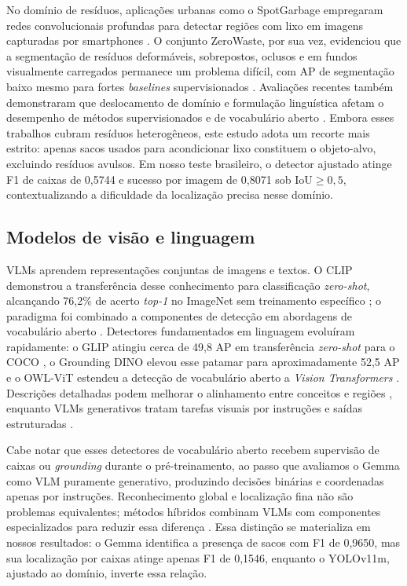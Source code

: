 \documentclass[kdmile,a4paper]{kdmile}
\begin{document}
No domínio de resíduos, aplicações urbanas como o SpotGarbage empregaram redes convolucionais profundas para detectar regiões com lixo em imagens capturadas por smartphones \cite{Mittal2016SpotGarbage}. O conjunto ZeroWaste, por sua vez, evidenciou que a segmentação de resíduos deformáveis, sobrepostos, oclusos e em fundos visualmente carregados permanece um problema difícil, com AP de segmentação baixo mesmo para fortes \emph{baselines} supervisionados \cite{Bashkirova2022ZeroWaste}. Avaliações recentes também demonstraram que deslocamento de domínio e formulação linguística afetam o desempenho de métodos supervisionados e de vocabulário aberto \cite{Abid2025WasteDetection}. Embora esses trabalhos cubram resíduos heterogêneos, este estudo adota um recorte mais estrito: apenas sacos usados para acondicionar lixo constituem o objeto-alvo, excluindo resíduos avulsos. Em nosso teste brasileiro, o detector ajustado atinge F1 de caixas de 0,5744 e sucesso por imagem de 0,8071 sob $\mathrm{IoU} \ge 0{,}5$, contextualizando a dificuldade da localização precisa nesse domínio.

\subsection{Modelos de visão e linguagem}
\label{sec:modelos-visao-linguagem}

VLMs aprendem representações conjuntas de imagens e textos. O CLIP demonstrou a transferência desse conhecimento para classificação \emph{zero-shot}, alcançando 76,2\% de acerto \emph{top-1} no ImageNet sem treinamento específico \cite{Radford2021CLIP}; o paradigma foi combinado a componentes de detecção em abordagens de vocabulário aberto \cite{Kuo2023FVLM}. Detectores fundamentados em linguagem evoluíram rapidamente: o GLIP atingiu cerca de 49,8 AP em transferência \emph{zero-shot} para o COCO \cite{Li2022GLIP}, o Grounding DINO elevou esse patamar para aproximadamente 52,5 AP \cite{Liu2024GroundingDINO} e o OWL-ViT estendeu a detecção de vocabulário aberto a \emph{Vision Transformers} \cite{Minderer2022OWLViT}. Descrições detalhadas podem melhorar o alinhamento entre conceitos e regiões \cite{Jin2024FineGrainedDescriptors}, enquanto VLMs generativos tratam tarefas visuais por instruções e saídas estruturadas \cite{Wang2023VisionLLM}.

Cabe notar que esses detectores de vocabulário aberto recebem supervisão de caixas ou \emph{grounding} durante o pré-treinamento, ao passo que avaliamos o Gemma como VLM puramente generativo, produzindo decisões binárias e coordenadas apenas por instruções. Reconhecimento global e localização fina não são problemas equivalentes; métodos híbridos combinam VLMs com componentes especializados para reduzir essa diferença \cite{Lin2024VLSAM}. Essa distinção se materializa em nossos resultados: o Gemma identifica a presença de sacos com F1 de 0,9650, mas sua localização por caixas atinge apenas F1 de 0,1546, enquanto o YOLOv11m, ajustado ao domínio, inverte essa relação.
\end{document}
